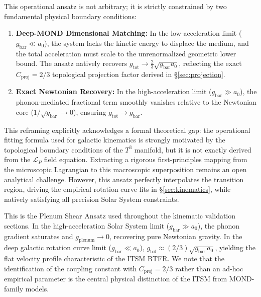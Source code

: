 \documentclass[aps,prd,10pt,twocolumn,superscriptaddress,nofootinbib,floatfix]{revtex4-2}
\begin{document}
This operational ansatz is not arbitrary; it is strictly constrained by two fundamental physical boundary conditions:
\begin{enumerate}
    \item \textbf{Deep-MOND Dimensional Matching:} In the low-acceleration limit ($g_{\text{bar}} \ll a_0$), the system lacks the kinetic energy to displace the medium, and the total acceleration must scale to the unrenormalized geometric lower bound. The ansatz natively recovers $g_{\text{tot}} \to \frac{2}{3}\sqrt{g_{\text{bar}}a_0}$, reflecting the exact $C_{\text{proj}} = 2/3$ topological projection factor derived in \S\ref{sec:projection}.
    \item \textbf{Exact Newtonian Recovery:} In the high-acceleration limit ($g_{\text{bar}} \gg a_0$), the phonon-mediated fractional term smoothly vanishes relative to the Newtonian core ($1/\sqrt{g_{\text{bar}}} \to 0$), ensuring $g_{\text{tot}} \to g_{\text{bar}}$.
\end{enumerate}

This reframing explicitly acknowledges a formal theoretical gap: the operational fitting formula used for galactic kinematics is strongly motivated by the topological boundary conditions of the $T^3$ manifold, but it is not exactly derived from the $\mathcal{L}_P$ field equation. Extracting a rigorous first-principles mapping from the microscopic Lagrangian to this macroscopic superposition remains an open analytical challenge. However, this ansatz perfectly interpolates the transition region, driving the empirical rotation curve fits in \S\ref{sec:kinematics}, while natively satisfying all precision Solar System constraints.

This is the Plenum Shear Ansatz used throughout the kinematic validation sections. In the high-acceleration Solar System limit ($g_{\text{bar}} \gg a_0$), the phonon gradient saturates and $g_{\text{plenum}} \to 0$, recovering pure Newtonian gravity. In the deep galactic rotation curve limit ($g_{\text{bar}} \ll a_0$), $g_{\text{tot}} \approx (2/3)\sqrt{g_{\text{bar}}\,a_0}$, yielding the flat velocity profile characteristic of the ITSM BTFR. We note that the identification of the coupling constant with $C_{\text{proj}} = 2/3$ rather than an ad-hoc empirical parameter is the central physical distinction of the ITSM from MOND-family models. 
\end{document}
